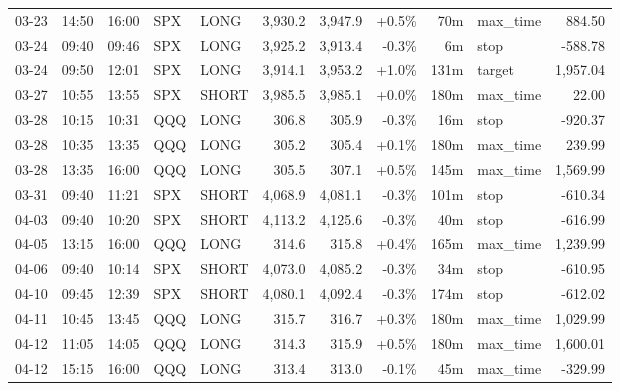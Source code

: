 \documentclass[11pt,a4paper,twoside]{article}
\begin{document}
\begin{center}
\begin{longtable}{>{\color{txtmain}}l l l l l r r r r >{\color{txtmain}}l r}
03-23 & 14:50 & 16:00 & SPX & LONG & 3,930.2 & 3,947.9 & \textcolor{wingreen}{+0.5\%} & 70m & max\_time & \textcolor{wingreen}{884.50} \\
03-24 & 09:40 & 09:46 & SPX & LONG & 3,925.2 & 3,913.4 & \textcolor{lossred}{-0.3\%} & 6m & stop & \textcolor{lossred}{-588.78} \\
03-24 & 09:50 & 12:01 & SPX & LONG & 3,914.1 & 3,953.2 & \textcolor{wingreen}{+1.0\%} & 131m & target & \textcolor{wingreen}{1,957.04} \\
03-27 & 10:55 & 13:55 & SPX & SHORT & 3,985.5 & 3,985.1 & \textcolor{wingreen}{+0.0\%} & 180m & max\_time & \textcolor{wingreen}{22.00} \\
03-28 & 10:15 & 10:31 & QQQ & LONG & 306.8 & 305.9 & \textcolor{lossred}{-0.3\%} & 16m & stop & \textcolor{lossred}{-920.37} \\
03-28 & 10:35 & 13:35 & QQQ & LONG & 305.2 & 305.4 & \textcolor{wingreen}{+0.1\%} & 180m & max\_time & \textcolor{wingreen}{239.99} \\
03-28 & 13:35 & 16:00 & QQQ & LONG & 305.5 & 307.1 & \textcolor{wingreen}{+0.5\%} & 145m & max\_time & \textcolor{wingreen}{1,569.99} \\
03-31 & 09:40 & 11:21 & SPX & SHORT & 4,068.9 & 4,081.1 & \textcolor{lossred}{-0.3\%} & 101m & stop & \textcolor{lossred}{-610.34} \\
04-03 & 09:40 & 10:20 & SPX & SHORT & 4,113.2 & 4,125.6 & \textcolor{lossred}{-0.3\%} & 40m & stop & \textcolor{lossred}{-616.99} \\
04-05 & 13:15 & 16:00 & QQQ & LONG & 314.6 & 315.8 & \textcolor{wingreen}{+0.4\%} & 165m & max\_time & \textcolor{wingreen}{1,239.99} \\
04-06 & 09:40 & 10:14 & SPX & SHORT & 4,073.0 & 4,085.2 & \textcolor{lossred}{-0.3\%} & 34m & stop & \textcolor{lossred}{-610.95} \\
04-10 & 09:45 & 12:39 & SPX & SHORT & 4,080.1 & 4,092.4 & \textcolor{lossred}{-0.3\%} & 174m & stop & \textcolor{lossred}{-612.02} \\
04-11 & 10:45 & 13:45 & QQQ & LONG & 315.7 & 316.7 & \textcolor{wingreen}{+0.3\%} & 180m & max\_time & \textcolor{wingreen}{1,029.99} \\
04-12 & 11:05 & 14:05 & QQQ & LONG & 314.3 & 315.9 & \textcolor{wingreen}{+0.5\%} & 180m & max\_time & \textcolor{wingreen}{1,600.01} \\
04-12 & 15:15 & 16:00 & QQQ & LONG & 313.4 & 313.0 & \textcolor{lossred}{-0.1\%} & 45m & max\_time & \textcolor{lossred}{-329.99} \\

\end{longtable}
\end{center}
\end{document}
